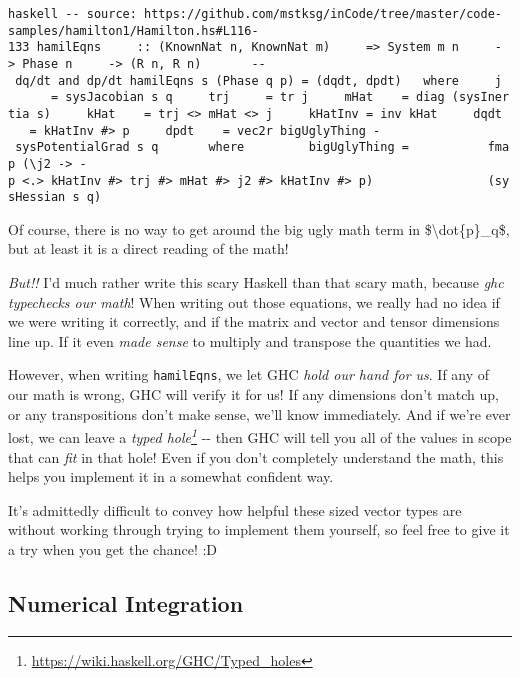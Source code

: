\documentclass[]{article}
\renewcommand{\href}[2]{#2\footnote{\url{#1}}}
\begin{document}
\texttt{haskell\ -\/-\ source:\ https://github.com/mstksg/inCode/tree/master/code-samples/hamilton1/Hamilton.hs\#L116-133\ hamilEqns\ \ \ \ \ ::\ (KnownNat\ n,\ KnownNat\ m)\ \ \ \ \ =\textgreater{}\ System\ m\ n\ \ \ \ \ -\textgreater{}\ Phase\ n\ \ \ \ \ -\textgreater{}\ (R\ n,\ R\ n)\ \ \ \ \ \ \ -\/-\ dq/dt\ and\ dp/dt\ hamilEqns\ s\ (Phase\ q\ p)\ =\ (dqdt,\ dpdt)\ \ \ where\ \ \ \ \ j\ \ \ \ \ \ \ =\ sysJacobian\ s\ q\ \ \ \ \ trj\ \ \ \ \ =\ tr\ j\ \ \ \ \ mHat\ \ \ \ =\ diag\ (sysInertia\ s)\ \ \ \ \ kHat\ \ \ \ =\ trj\ \textless{}\textgreater{}\ mHat\ \textless{}\textgreater{}\ j\ \ \ \ \ kHatInv\ =\ inv\ kHat\ \ \ \ \ dqdt\ \ \ \ =\ kHatInv\ \#\textgreater{}\ p\ \ \ \ \ dpdt\ \ \ \ =\ vec2r\ bigUglyThing\ -\ sysPotentialGrad\ s\ q\ \ \ \ \ \ \ where\ \ \ \ \ \ \ \ \ bigUglyThing\ =\ \ \ \ \ \ \ \ \ \ \ fmap\ (\textbackslash{}j2\ -\textgreater{}\ -p\ \textless{}.\textgreater{}\ kHatInv\ \#\textgreater{}\ trj\ \#\textgreater{}\ mHat\ \#\textgreater{}\ j2\ \#\textgreater{}\ kHatInv\ \#\textgreater{}\ p)\ \ \ \ \ \ \ \ \ \ \ \ \ \ \ \ (sysHessian\ s\ q)}

Of course, there is no way to get around the big ugly math term in
\$\textbackslash{}dot\{p\}\_q\$, but at least it is a direct reading of the
math!

\emph{But!!} I'd much rather write this scary Haskell than that scary math,
because \emph{ghc typechecks our math}! When writing out those equations, we
really had no idea if we were writing it correctly, and if the matrix and vector
and tensor dimensions line up. If it even \emph{made sense} to multiply and
transpose the quantities we had.

However, when writing \texttt{hamilEqns}, we let GHC \emph{hold our hand for
us}. If any of our math is wrong, GHC will verify it for us! If any dimensions
don't match up, or any transpositions don't make sense, we'll know immediately.
And if we're ever lost, we can leave a
\emph{\href{https://wiki.haskell.org/GHC/Typed_holes}{typed hole}} -\/- then GHC
will tell you all of the values in scope that can \emph{fit} in that hole! Even
if you don't completely understand the math, this helps you implement it in a
somewhat confident way.

It's admittedly difficult to convey how helpful these sized vector types are
without working through trying to implement them yourself, so feel free to give
it a try when you get the chance! :D

\subsection{Numerical Integration}
\end{document}
